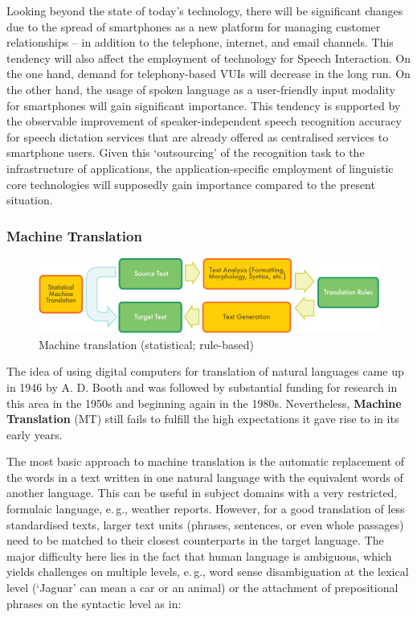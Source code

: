 \documentclass[]{../../metanetpaper}
\begin{document}
\begin{multicols}{2}
Looking beyond the state of today’s technology, there will be significant changes due to the spread of smartphones as a new platform for managing customer relationships – in addition to the telephone, internet, and email channels. This tendency will also affect the employment of technology for Speech Interaction. On the one hand, demand for telephony-based VUIs will decrease in the long run. On the other hand, the usage of spoken language as a user-friendly input modality for smartphones will gain significant importance. This tendency is supported by the observable improvement of speaker-independent speech recognition accuracy for speech dictation services that are already offered as centralised services to smartphone users. Given this ‘outsourcing’ of the recognition task to the infrastructure of applications, the application-specific employment of linguistic core technologies will supposedly gain importance compared to the present situation.

\subsubsection{Machine Translation}

\begin{figure}[htb]
  \center
  \includegraphics[width=\textwidth]{../_media/english/machine_translation}
  \caption{Machine translation (statistical; rule-based)}
  \label{fig:mtarch_en}
\end{figure}

The idea of using digital computers for translation of natural languages came up in 1946 by A. D. Booth and was followed by substantial funding for research in this area in the 1950s and beginning again in the 1980s. Nevertheless, \textbf{Machine Translation} (MT) still fails to fulfill the high expectations it gave rise to in its early years.  


The most basic approach to machine translation is the automatic replacement of the words in a text written in one natural language with the equivalent words of another language. This can be useful in subject domains with a very restricted, formulaic language, e.\,g., weather reports. However, for a good translation of less standardised texts, larger text units (phrases, sentences, or even whole passages) need to be matched to their closest counterparts in the target language. The major difficulty here lies in the fact that human language is ambiguous, which yields challenges on multiple levels, e.\,g., word sense disambiguation at the lexical level (`Jaguar' can mean a car or an animal) or the attachment of prepositional phrases on the syntactic level as in:


\end{multicols}
\end{document}
